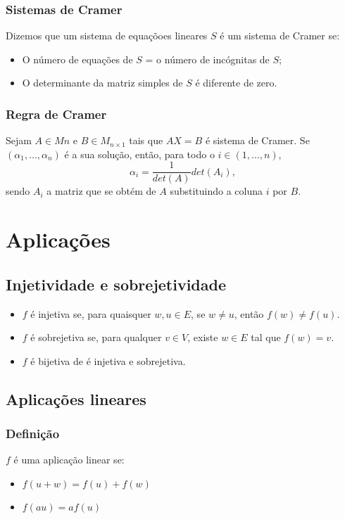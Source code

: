 \documentclass[10pt,a4paper]{report}
\begin{document}
\subsection{Sistemas de Cramer}
Dizemos que um sistema de equaçõoes lineares $S$ é um sistema de
Cramer se:
\begin{itemize}
\item O número de equações de $S$ = o número de incógnitas de $S$;
\item O determinante da matriz simples de $S$ é diferente de zero.
\end{itemize}

\subsection{Regra de Cramer}
Sejam $A \in Mn$ e $B \in M_{n \times 1}$ tais que $A X = B$ é sistema de Cramer. Se $(\alpha_1, ..., \alpha_n)$ é a sua solução, então, para
todo o $i \in (1, ..., n)$,
$$
\alpha_i = \frac{1}{det(A)}det(A_i),
$$
sendo $A_i$ a matriz que se obtém de $A$ substituindo a coluna $i$ por
$B$.

\chapter{Aplicações}

\section{Injetividade e sobrejetividade}
\begin{itemize}
\item $f$ é injetiva se, para quaisquer $w, u \in E$, se $w \neq u$, então $f(w) \neq f(u)$.
\item $f$ é sobrejetiva se, para qualquer $v \in V$, existe $w \in E$ tal que $f(w) = v$.
\item $f$ é bijetiva de é injetiva e sobrejetiva.
\end{itemize}

\section{Aplicações lineares}
\subsection{Definição}
$f$ é uma aplicação linear se:
\begin{itemize}
\item $f(u+w) = f(u) + f(w)$
\item $f(au) = af(u)$
\end{itemize}
\end{document}
